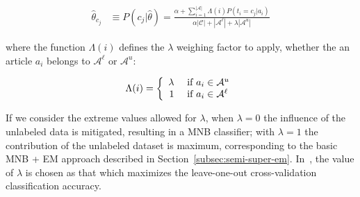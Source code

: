 \begin{equation}
\begin{split}
    \hat{\theta}_{c_j} &\equiv P(c_j|\hat{\theta}) = \frac{\alpha + \sum_{i=1}^{|\mathcal{A}|}\Lambda(i)P(t_i = c_j|a_i)}{\alpha|\mathcal{C}| + |\mathcal{A}^{\ell}| + \lambda|\mathcal{A}^{u}|}
    \label{eq:prior-estimate-lambda}
\end{split}
\end{equation}

where the function $\Lambda(i)$ defines the $\lambda$ weighing factor to apply, 
whether the an article $a_i$ belongs to $\mathcal{A}^{\ell}$ or 
$\mathcal{A}^{u}$:

\begin{equation}
    \Lambda(i) = \left\{ 
        \begin{array}{rl}
            \lambda &\mbox{ \text{if $a_i \in \mathcal{A}^{u}$}} \\
            1 &\mbox{ \text{if $a_i \in \mathcal{A}^{\ell}$}}
        \end{array} \right.
    \label{eq:1-final}
\end{equation}

If we consider the extreme values allowed for $\lambda$, when $\lambda = 0$ 
the influence of the unlabeled data is mitigated, resulting in a MNB classifier; 
with $\lambda = 1$ the contribution of the unlabeled dataset is maximum, 
corresponding to the basic MNB + EM approach described in 
Section~\ref{subsec:semi-super-em}. In~\cite{Nigam2000}, the value of 
$\lambda$ is chosen as that which maximizes the leave-one-out cross-validation 
classification accuracy.

